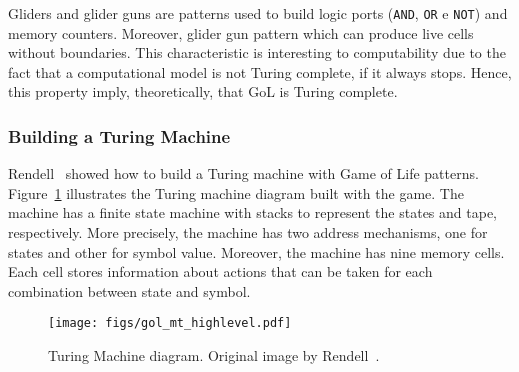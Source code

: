 \documentclass[12pt]{article}
\begin{document}
Gliders and glider guns are patterns used to build logic ports (\texttt{AND}, \texttt{OR} e \texttt{NOT}) and memory counters. Moreover, glider gun pattern which can produce live cells without boundaries. This characteristic is interesting to computability due to the fact that a computational model is not Turing complete, if it always stops. Hence, this property imply, theoretically, that GoL is Turing complete.


\subsubsection{Building a Turing Machine}

Rendell~\cite{Rendell:inproc:2011:jul, Rendell:phd:2014:jan} showed how to build a Turing machine with Game of Life patterns. Figure~\ref{fig:gol_mt_highlevel} illustrates the Turing machine diagram built with the game. The machine has a finite state machine with stacks to represent the states and tape, respectively. More precisely, the machine has two address mechanisms, one for states and other for symbol value. Moreover, the machine has nine memory cells. Each cell stores information about actions that can be taken for each combination between state and symbol.


\begin{figure}[h]
    \centering
    \texttt{[image: figs/gol\_mt\_highlevel.pdf]}
    \caption{Turing Machine diagram. Original image by Rendell~\cite{Rendell:inproc:2011:jul}.}
    \label{fig:gol_mt_highlevel}
\end{figure}
\end{document}
